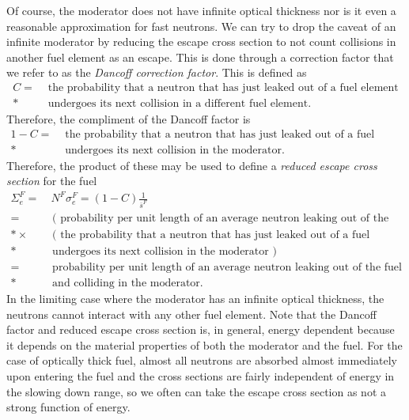 Of course, the moderator does not have infinite optical thickness nor is it even a reasonable approximation for fast neutrons. We can try to drop the caveat of an infinite moderator by reducing the escape cross section to not count collisions in another fuel element as an escape. This is done through a correction factor that we refer to as the \emph{Dancoff correction factor}. This is defined as
\begin{align}
  C = &\text{ the probability that a neutron that has just leaked out of a fuel element} \nonumber \\*
      &\text{ undergoes its next collision in a different fuel element.} \nonumber
\end{align}
Therefore, the compliment of the Dancoff factor is
\begin{align}
  1 - C = 
  &\text{ the probability that a neutron that has just leaked out of a fuel element} \nonumber \\*
  &\text{ undergoes its next collision in the moderator.} \nonumber
\end{align}
Therefore, the product of these may be used to define a \emph{reduced escape cross section} for the fuel
\begin{align}
  \Sigma_e^F = &\ N^F \sigma_e^F = (1 - C) \frac{1}{\overline{s}^F} \\
  = &\text{ ( probability per unit length of an average neutron leaking out of the fuel )} \nonumber \\*
  \times    &\text{ ( the probability that a neutron that has just leaked out of a fuel element} \nonumber \\*
  &\text{ undergoes its next collision in the moderator )} \nonumber \\
  = &\text{ probability per unit length of an average neutron leaking out of the fuel } \nonumber \\* 
  &\text{ and colliding in the moderator.} \nonumber
\end{align}
In the limiting case where the moderator has an infinite optical thickness, the neutrons cannot interact with any other fuel element. Note that the Dancoff factor and reduced escape cross section is, in general, energy dependent because it depends on the material properties of both the moderator and the fuel. For the case of optically thick fuel, almost all neutrons are absorbed almost immediately upon entering the fuel and the cross sections are fairly independent of energy in the slowing down range, so we often can take the escape cross section as not a strong function of energy.

